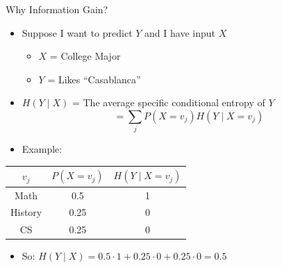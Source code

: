 \begin{frame}[allowframebreaks]{Why Information Gain?}

\begin{itemize}
  \item Suppose I want to predict $Y$ and I have input $X$
  \begin{itemize}
    \item $X$ = College Major
    \item $Y$ = Likes ``Casablanca''
  \end{itemize}
\end{itemize}


\begin{itemize}
  \item $H(Y \mid X)$ = The average specific conditional entropy of $Y$
  \[
  = \sum_j P(X = v_j) H(Y \mid X = v_j)
  \]
  \item Example:
\end{itemize}

\begin{center}
\begin{tabular}{|c|c|c|}
\hline
$v_j$ & $P(X = v_j)$ & $H(Y \mid X = v_j)$ \\
\hline
Math & 0.5 & 1 \\
History & 0.25 & 0 \\
CS & 0.25 & 0 \\
\hline
\end{tabular}
\end{center}

\begin{itemize}
  \item So: $H(Y \mid X) = 0.5 \cdot 1 + 0.25 \cdot 0 + 0.25 \cdot 0 = 0.5$
\end{itemize}

\end{frame}


